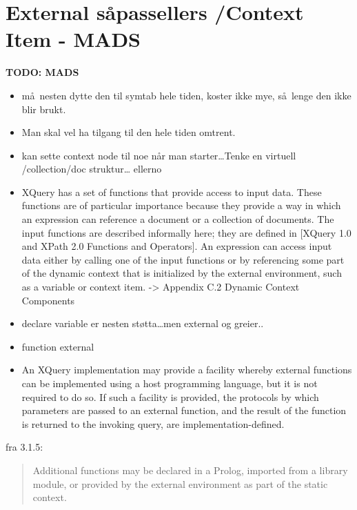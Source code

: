 \section{External s\aa passellers /Context Item - {MADS}}
\label{sect:disc:ctxItem}
\textbf{\LARGE TODO: {MADS}}
\begin{itemize}
  \item m\aa~nesten dytte den til symtab hele tiden, koster ikke mye, s\aa~lenge den ikke blir brukt.
  \item Man skal vel ha tilgang til den hele tiden omtrent.
  \item kan sette context node til noe n\aa r man starter\ldots Tenke en virtuell /collection/doc struktur\ldots
  ellerno
  \item XQuery has a set of functions that provide access to input data. These functions are of particular
  importance because they provide a way in which an expression can reference a document or a collection of
  documents. The input functions are described informally here; they are defined in [XQuery 1.0 and XPath 2.0
  Functions and Operators]. An expression can access input data either by calling one of the input functions or by
  referencing some part of the dynamic context that is initialized by the external environment, such as a variable
  or context item. -> Appendix C.2 Dynamic Context Components
\item declare variable er nesten st\o tta\ldots men external og greier..
\item function external
\item An XQuery implementation may provide a facility whereby external functions can be implemented using a host
programming language, but it is not required to do so. If such a facility is provided, the protocols by which
parameters are passed to an external function, and the result of the function is returned to the invoking query,
are implementation-defined.

\end{itemize}

fra 3.1.5:
\begin{quote}
  Additional functions may be declared in a Prolog, imported from a library module, or provided by the external
  environment as part of the static context.
  \end{quote}

